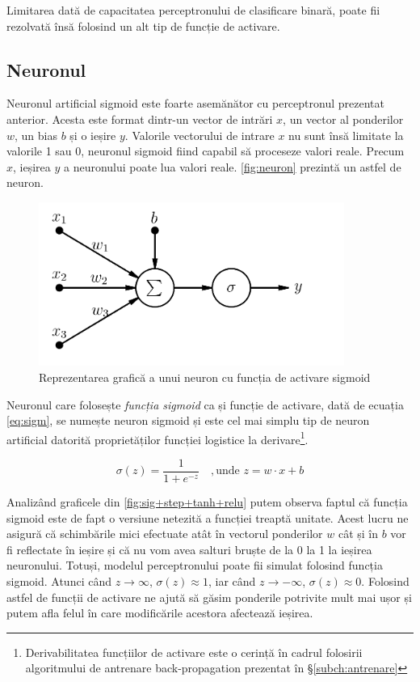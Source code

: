 Limitarea dată de capacitatea perceptronului de clasificare binară, poate fii rezolvată însă folosind un alt tip de funcție de activare. 

\subsection{Neuronul}
Neuronul artificial sigmoid este foarte asemănător cu perceptronul prezentat anterior. Acesta este format dintr-un vector de intrări $x$, un vector al ponderilor $w$, un bias $b$ și o ieșire $y$. Valorile vectorului de intrare $x$ nu sunt însă limitate la valorile 1 sau 0, neuronul sigmoid fiind capabil să proceseze valori reale. Precum $x$, ieșirea $y$ a neuronului poate lua valori reale. \autoref{fig:neuron} prezintă un astfel de neuron.
\begin{figure}[ht]
\centering
\includegraphics[width=10cm,keepaspectratio]{fig/cap2/artificial-neuron.png}
\caption{Reprezentarea grafică a unui neuron cu funcția de activare sigmoid}\label{fig:neuron}
\end{figure}

Neuronul care folosește \textit{funcția sigmoid} ca și funcție de activare, dată de ecuația \eqref{eq:sigm}, se numește neuron sigmoid și este cel mai simplu tip de neuron artificial datorită proprietăților funcției logistice la derivare\footnote{Derivabilitatea funcțiilor de activare este o cerință în cadrul folosirii algoritmului de antrenare back-propagation prezentat în \S\ref{subch:antrenare}}.

\begin{equation}
\sigma(z) = \frac{1}{1+e^{-z}} \quad,\text{unde }z= w\cdot x + b
\label{eq:sigm}
\end{equation}

Analizând graficele din \autoref{fig:sig+step+tanh+relu} putem observa faptul că funcția sigmoid este de fapt o versiune netezită a funcției treaptă unitate. Acest lucru ne asigură că schimbările mici efectuate atât în vectorul ponderilor $w$ cât și în $b$ vor fi reflectate în ieșire și că nu vom avea salturi bruște de la 0 la 1 la ieșirea neuronului.
Totuși, modelul perceptronului poate fii simulat folosind funcția sigmoid. Atunci când $z\rightarrow\infty$, $\sigma(z)\approx 1$, iar când $z\rightarrow-\infty$, $\sigma(z)\approx 0$. Folosind astfel de funcții de activare ne ajută să găsim ponderile potrivite mult mai ușor și putem afla felul în care modificările acestora afectează ieșirea.

